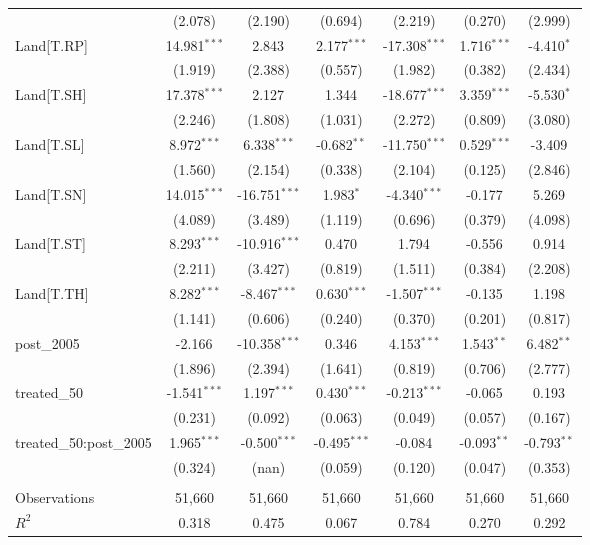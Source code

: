 \begin{table}[!htbp]
\begin{tabular}{@{\extracolsep{5pt}}lcccccc}
  & (2.078) & (2.190) & (0.694) & (2.219) & (0.270) & (2.999) \\
 Land[T.RP] & 14.981$^{***}$ & 2.843$^{}$ & 2.177$^{***}$ & -17.308$^{***}$ & 1.716$^{***}$ & -4.410$^{*}$ \\
  & (1.919) & (2.388) & (0.557) & (1.982) & (0.382) & (2.434) \\
 Land[T.SH] & 17.378$^{***}$ & 2.127$^{}$ & 1.344$^{}$ & -18.677$^{***}$ & 3.359$^{***}$ & -5.530$^{*}$ \\
  & (2.246) & (1.808) & (1.031) & (2.272) & (0.809) & (3.080) \\
 Land[T.SL] & 8.972$^{***}$ & 6.338$^{***}$ & -0.682$^{**}$ & -11.750$^{***}$ & 0.529$^{***}$ & -3.409$^{}$ \\
  & (1.560) & (2.154) & (0.338) & (2.104) & (0.125) & (2.846) \\
 Land[T.SN] & 14.015$^{***}$ & -16.751$^{***}$ & 1.983$^{*}$ & -4.340$^{***}$ & -0.177$^{}$ & 5.269$^{}$ \\
  & (4.089) & (3.489) & (1.119) & (0.696) & (0.379) & (4.098) \\
 Land[T.ST] & 8.293$^{***}$ & -10.916$^{***}$ & 0.470$^{}$ & 1.794$^{}$ & -0.556$^{}$ & 0.914$^{}$ \\
  & (2.211) & (3.427) & (0.819) & (1.511) & (0.384) & (2.208) \\
 Land[T.TH] & 8.282$^{***}$ & -8.467$^{***}$ & 0.630$^{***}$ & -1.507$^{***}$ & -0.135$^{}$ & 1.198$^{}$ \\
  & (1.141) & (0.606) & (0.240) & (0.370) & (0.201) & (0.817) \\
 post_2005 & -2.166$^{}$ & -10.358$^{***}$ & 0.346$^{}$ & 4.153$^{***}$ & 1.543$^{**}$ & 6.482$^{**}$ \\
  & (1.896) & (2.394) & (1.641) & (0.819) & (0.706) & (2.777) \\
 treated_50 & -1.541$^{***}$ & 1.197$^{***}$ & 0.430$^{***}$ & -0.213$^{***}$ & -0.065$^{}$ & 0.193$^{}$ \\
  & (0.231) & (0.092) & (0.063) & (0.049) & (0.057) & (0.167) \\
 treated_50:post_2005 & 1.965$^{***}$ & -0.500$^{***}$ & -0.495$^{***}$ & -0.084$^{}$ & -0.093$^{**}$ & -0.793$^{**}$ \\
  & (0.324) & (nan) & (0.059) & (0.120) & (0.047) & (0.353) \\
\hline \\[-1.8ex]
 Observations & 51,660 & 51,660 & 51,660 & 51,660 & 51,660 & 51,660 \\
 $R^2$ & 0.318 & 0.475 & 0.067 & 0.784 & 0.270 & 0.292 \\

\end{tabular}
\end{table}
